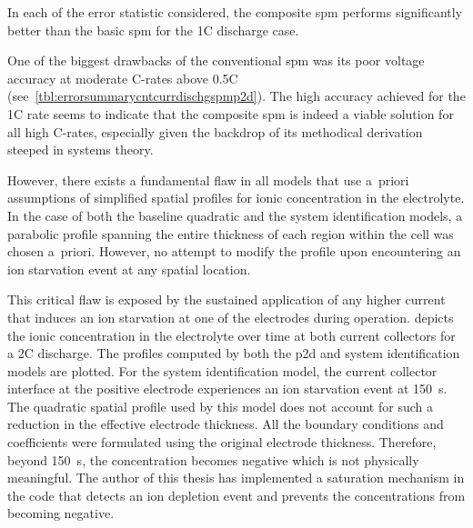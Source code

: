 

In  each of  the error  statistic considered,  the composite  \gls{spm} performs
significantly better than the basic \gls{spm} for the 1C discharge case.

One   of   the   biggest   drawbacks   of   the   conventional   \gls{spm}   was
its    poor    voltage    accuracy    at    moderate    C-rates    above    0.5C
(see~\cref{tbl:errorsummarycntcurrdischgspmp2d}). The high accuracy achieved for
the 1C rate  seems to indicate that  the composite \gls{spm} is  indeed a viable
solution for all  high C-rates, especially given the backdrop  of its methodical
derivation steeped in systems theory.

However,  there exists  a  fundamental  flaw in  all  models  that use  a~priori
assumptions  of  simplified spatial  profiles  for  ionic concentration  in  the
electrolyte.  In  the  case  of  both the  baseline  quadratic  and  the  system
identification models, a parabolic profile spanning the entire thickness of each
region within the cell was chosen a~priori. However, no attempt to modify the
profile upon encountering an ion starvation event at any spatial location.

This  critical flaw  is  exposed  by the  sustained  application  of any  higher
current  that  induces  an  ion  starvation at  one  of  the  electrodes  during
operation.  depicts  the  ionic concentration  in  the
electrolyte  over time  at  both  current collectors  for  a  2C discharge.  The
profiles computed  by both  the \gls{p2d} and  system identification  models are
plotted. For  the system identification  model, the current  collector interface
at  the  positive electrode  experiences  an  ion  starvation event  at  \approx
\SI{150}{\second}. The  quadratic spatial  profile used by  this model  does not
account  for  such  a  reduction  in  the  effective  electrode  thickness.  All
the  boundary conditions  and coefficients  were formulated  using the  original
electrode  thickness.  Therefore,  beyond \SI{150}{\second},  the  concentration
becomes negative which  is not physically meaningful. The author  of this thesis
has implemented a saturation mechanism in the code that detects an ion depletion
event and prevents the concentrations from becoming negative.


